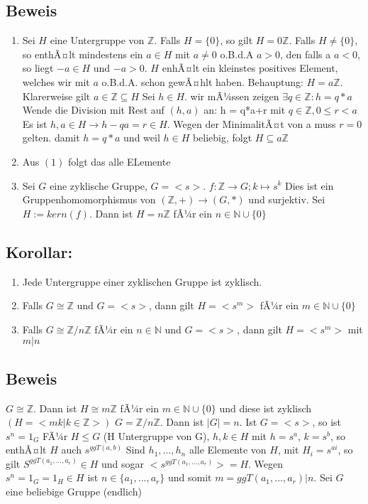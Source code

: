 \documentclass[12pt,a4paper,ngerman]{scrreprt}
\begin{document}
\subsection{Beweis}
\begin{enumerate}[(1)]
\item Sei $H$ eine Untergruppe von $\mathbb{Z}$.
Falls $H = \{0\}$, so gilt $H = 0\mathbb{Z}$.
Falls $H \neq \{0\}$, so enthÃ¤lt %
mindestens ein $a \in H$ mit $a \neq 0$ o.B.d.A $a > 0$, den falls a $a < 0$,
so liegt $-a \in H$ und $-a > 0$. 
$H$ enhÃ¤lt ein kleinstes positives Element, welches wir mit $a$ o.B.d.A. schon gewÃ¤hlt haben.
Behauptung: $H = a\mathbb{Z}$. Klarerweise gilt $a \in \mathbb{Z} \subseteq H$
Sei $h \in H$. wir mÃ¼ssen zeigen $\exists q \in \mathbb{Z}: h = q*a$
Wende die Division mit Rest auf $(h,a)$ an: h = q*a+r mit $q \in \mathbb{Z}, 0\leq r < a$
Es ist $h,a \in H \to h-qa = r \in H.$
Wegen der MinimalitÃ¤t von a muss $r = 0$ gelten.
damit $h = q*a$ und weil $h \in H$ beliebig, folgt $H \subseteq a\mathbb{Z}$
\item Aus $(1)$ folgt das alle ELemente %
\item Sei $G$ eine zyklische Gruppe, $G = <s>$. 
$f: \mathbb{Z} \to G ; k \mapsto s^k$ 
Dies ist ein Gruppenhomomorphismus von $(\mathbb{Z},+) \to (G,*)$ und surjektiv.
Sei $H := kern(f)$. Dann ist $H = n\mathbb{Z}$ fÃ¼r ein $n \in \mathbb{N} \cup \{0\}$
\end{enumerate}

\subsection{Korollar:}
\begin{enumerate}[1)]
\item Jede Untergruppe einer zyklischen Gruppe ist zyklisch.
\item Falls $G \cong \mathbb{Z}$ und $G = <s>$, 
dann gilt $H = <s^m>$ fÃ¼r ein $m \in \mathbb{N} \cup \{0\}$
\item Falls $G \cong \mathbb{Z}/n\mathbb{Z}$ fÃ¼r ein $n \in \mathbb{N}$ und $G = <s>$,
dann gilt $H = <s^m>$ mit $m|n$
\end{enumerate}
\subsection{Beweis}
$G \cong \mathbb{Z}$. Dann ist $H \cong m\mathbb{Z}$ fÃ¼r ein $m \in \mathbb{N} \cup \{0\}$
und diese ist zyklisch $(H=<mk|k\in\mathbb{Z}>)$
$G = \mathbb{Z}/n\mathbb{Z}$. Dann ist $|G|=n$. Ist $G=<s>$, so ist $s^n = 1_G$
FÃ¼r $H \leq G$ (H Untergruppe von G), $h,k \in H$ mit $h=s^a$, $k = s^b$,
so enthÃ¤lt $H$ auch $s^{ggT(a,b)}$
Sind $h_1, ..., h_n$ alle Elemente von $H$, mit $H_i = s^{ai}$, 
so gilt $S^{ggT(a_1,...,a_r)} \in H$ und sogar $<s^{ggT(a_1,...,a_r)}> = H$. 
Wegen $s^n = 1_G = 1_H \in H$ ist $n \in \{a_1, ... , a_r\}$ 
und somit $ m = ggT(a_1, ... , a_r) | n$.
Sei $G$ eine beliebige Gruppe (endlich)
\end{document}
